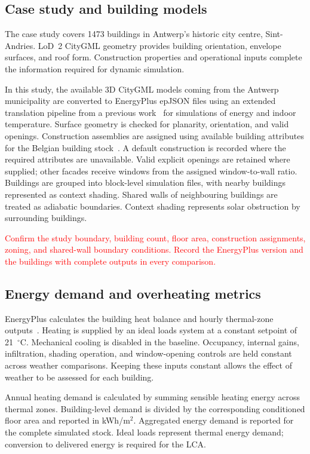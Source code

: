 \documentclass[runningheads]{llncs}
\newcommand{\TODO}[1]{\textcolor{red}{#1}}
\begin{document}
\subsection{Case study and building models}

The case study covers 1473 buildings in Antwerp's historic city centre, Sint-Andries. LoD~2 CityGML geometry provides building orientation, envelope surfaces, and roof form. Construction properties and operational inputs complete the information required for dynamic simulation.

In this study, the available 3D CityGML models coming from the Antwerp municipality are converted to EnergyPlus epJSON files using an extended translation pipeline from a previous work~\cite{Morales2025CityJSON} for simulations of energy and indoor temperature. Surface geometry is checked for planarity, orientation, and valid openings. Construction assemblies are assigned using available building attributes for the Belgian building stock~\cite{Loga2016TABULA}. A default construction is recorded where the required attributes are unavailable. Valid explicit openings are retained where supplied; other facades receive windows from the assigned window-to-wall ratio. Buildings are grouped into block-level simulation files, with nearby buildings represented as context shading. Shared walls of neighbouring buildings are treated as adiabatic boundaries. Context shading represents solar obstruction by surrounding buildings.

\TODO{Confirm the study boundary, building count, floor area, construction assignments, zoning, and shared-wall boundary conditions. Record the EnergyPlus version and the buildings with complete outputs in every comparison.}

\subsection{Energy demand and overheating metrics}

EnergyPlus calculates the building heat balance and hourly thermal-zone outputs~\cite{Crawley2001EnergyPlus}. Heating is supplied by an ideal loads system at a constant setpoint of 21~$^\circ$C. Mechanical cooling is disabled in the baseline. Occupancy, internal gains, infiltration, shading operation, and window-opening controls are held constant across weather comparisons. Keeping these inputs constant allows the effect of weather to be assessed for each building.

Annual heating demand is calculated by summing sensible heating energy across thermal zones. Building-level demand is divided by the corresponding conditioned floor area and reported in kWh/m$^2$. Aggregated energy demand is reported for the complete simulated stock. Ideal loads represent thermal energy demand; conversion to delivered energy is required for the LCA.
\end{document}
